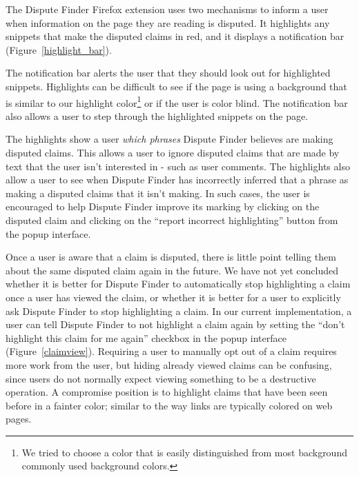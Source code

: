 \documentclass{www2010-submission}
\begin{document}
%
%

The Dispute Finder Firefox extension uses two mechanisms to inform a user when information on the page they are reading is disputed. It highlights any snippets that make the disputed claims in red, and it displays a notification bar (Figure~\ref{highlight_bar}). 

The notification bar alerts the user that they should look out for highlighted snippets. Highlights can be difficult to see if the page is using a background that is similar to our highlight color\footnote{We tried to choose a color that is easily distinguished from most background commonly used background colors.} or if the user is color blind. The notification bar also allows a user to step through the highlighted snippets on the page.

The highlights show a user {\it which phrases} Dispute Finder believes are making disputed claims. This allows a user to ignore disputed claims that are made by text that the user isn't interested in - such as user comments. The highlights also allow a user to see when Dispute Finder has incorrectly inferred that a phrase as making a disputed claims that it isn't making. In such cases, the user is encouraged to help Dispute Finder improve its marking by clicking on the disputed claim and clicking on the ``report incorrect highlighting'' button from the popup interface.

Once a user is aware that a claim is disputed, there is little point telling them about the same disputed claim again in the future. We have not yet concluded whether it is better for Dispute Finder to automatically stop highlighting a claim once a user has viewed the claim, or whether it is better for a user to explicitly ask Dispute Finder to stop highlighting a claim. In our current implementation, a user can tell Dispute Finder to not highlight a claim again by setting the ``don't highlight this claim for me again'' checkbox in the popup interface (Figure~\ref{claimview}). Requiring a user to manually opt out of a claim requires more work from the user, but hiding already viewed claims can be confusing, since users do not normally expect viewing something to be a destructive operation. A compromise position is to highlight claims that have been seen before in a fainter color; similar to the way links are typically colored on web pages.
\end{document}
